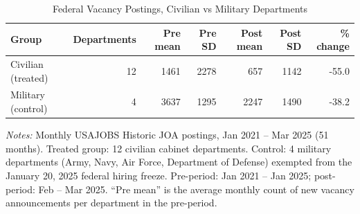 
\begin{table}[!ht]
\centering
\caption{Federal Vacancy Postings, Civilian vs Military Departments}
\label{tab:summary}
\small
\begin{tabular}{lrrrrrr}
\toprule
Group & Departments & Pre mean & Pre SD & Post mean & Post SD & \% change \\
\midrule
Civilian (treated) & 12 & 1461 & 2278 & 657 & 1142 & -55.0 \\
Military (control) & 4 & 3637 & 1295 & 2247 & 1490 & -38.2 \\
\bottomrule
\end{tabular}
\begin{minipage}{0.95\textwidth}
\footnotesize\textit{Notes:} Monthly USAJOBS Historic JOA postings, Jan 2021 -- Mar 2025 (51 months). Treated group: 12 civilian cabinet departments. Control: 4 military departments (Army, Navy, Air Force, Department of Defense) exempted from the January 20, 2025 federal hiring freeze. Pre-period: Jan 2021 -- Jan 2025; post-period: Feb -- Mar 2025. ``Pre mean'' is the average monthly count of new vacancy announcements per department in the pre-period.
\end{minipage}
\end{table}
